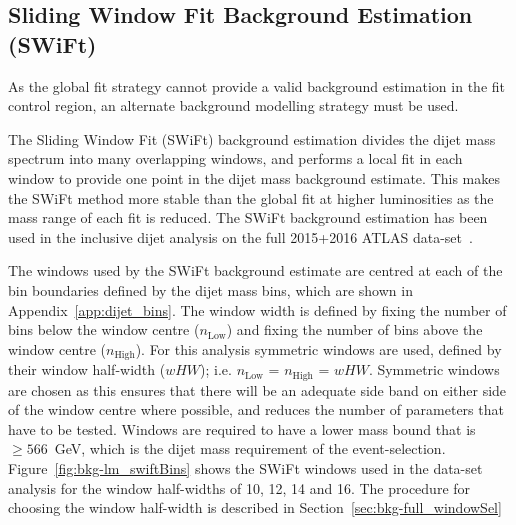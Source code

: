 
\newpage
\subsection{Sliding Window Fit Background Estimation (SWiFt)}\label{sec:bkg-full_swift}

As the global fit strategy cannot provide a valid background estimation in the
\lm{} fit control region, an alternate background modelling strategy must be used.

The Sliding Window Fit (SWiFt) background estimation divides the dijet mass spectrum into many overlapping windows,
and performs a local fit in each window to provide one point in the dijet mass background estimate.
This makes the SWiFt method more stable than the global fit at higher luminosities as the mass range of each fit is reduced.
The SWiFt background estimation has been used in the inclusive dijet analysis on the full 2015+2016 ATLAS data-set~\cite{dijet-mori17_paper}.

The windows used by the SWiFt background estimate are centred at each of the
bin boundaries defined by the dijet mass bins, which are shown in Appendix~\ref{app:dijet_bins}.
The window width is defined by fixing the number of bins below the window centre ($n_{\text{Low}}$)
and fixing the number of bins above the window centre ($n_{\text{High}}$).
For this analysis symmetric windows are used, defined by their window half-width ($wHW$); i.e. $n_{\text{Low}}$ = $n_{\text{High}}$ = $wHW$.
Symmetric windows are chosen as this ensures that there will be an adequate side band on either side of the window centre where possible,
and reduces the number of parameters that have to be tested.
Windows are required to have a lower mass bound that is $\geq566$~GeV, which is the dijet mass requirement of the event-selection.
Figure~\ref{fig:bkg-lm_swiftBins} shows the SWiFt windows used in the \lm{} data-set analysis for the window half-widths of 10, 12, 14 and 16.
The procedure for choosing the window half-width is described in Section~\ref{sec:bkg-full_windowSel}


